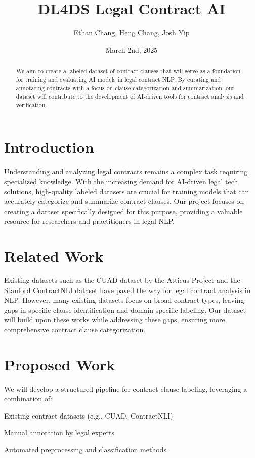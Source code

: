 \documentclass[11pt, oneside]{article}   	%
\title{DL4DS Legal Contract AI}
\author{Ethan Chang, Heng Chang, Josh Yip}
\date{March 2nd, 2025}		%
\begin{document}
\maketitle
\begin{abstract}
We aim to create a labeled dataset of contract clauses that will serve as a foundation for 
training and evaluating AI models in legal contract NLP. By curating and annotating contracts with a focus on clause categorization and summarization, our dataset will contribute to the development of AI-driven tools for contract analysis and verification.
\end{abstract}



\section*{Introduction}
Understanding and analyzing legal contracts remains a complex task requiring specialized knowledge. With the increasing demand for AI-driven legal tech solutions, high-quality labeled datasets are crucial for training models that can accurately categorize and summarize contract clauses. Our project focuses on creating a dataset specifically designed for this purpose, providing a valuable resource for researchers and practitioners in legal NLP.


\section*{Related Work}
Existing datasets such as the CUAD dataset by the Atticus Project and the Stanford ContractNLI dataset have paved the way for legal contract analysis in NLP. However, many existing datasets focus on broad contract types, leaving gaps in specific clause identification and domain-specific labeling. Our dataset will build upon these works while addressing these gaps, ensuring more comprehensive contract clause categorization.

\section*{Proposed Work}
We will develop a structured pipeline for contract clause labeling, leveraging a combination of:

Existing contract datasets (e.g., CUAD, ContractNLI)

Manual annotation by legal experts

Automated preprocessing and classification methods
\end{document}
